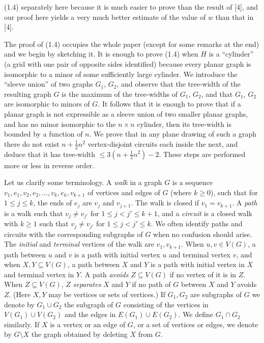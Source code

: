 \stmt
(1.4) separately here because it is much easier to prove than the result of [4], and our proof here yields a very much better estimate of the value of $w$ than that in [4].

The proof of (1.4) occupies the whole paper (except for some remarks at the end) and we begin by sketching it. It is enough to prove (1.4) when $H$ is a ``cylinder'' (a grid with one pair of opposite sides identified) because every planar graph is isomorphic to a minor of some sufficiently large cylinder. We introduce the ``sleeve union'' of two graphs $G_1$, $G_2$, and observe that the tree-width of the resulting graph $G$ is the maximum of the tree-widths of $G_1$, $G_2$, and that $G_1$, $G_2$ are isomorphic to minors of $G$. It follows that it is enough to prove that if a planar graph is not expressible as a sleeve union of two smaller planar graphs, and has no minor isomorphic to the $n \times n$ cylinder, then its tree-width is bounded by a function of $n$. We prove that in any plane drawing of such a graph there do not exist $n + \frac{1}{2} n^2$ vertex-disjoint circuits each inside the next, and deduce that it has tree-width $\le 3(n + \frac{1}{2} n^2) - 2$. These steps are performed more or less in reverse order.

Let us clarify some terminology. A \textit{walk} in a graph $G$ is a sequence $v_1, e_1, v_2, e_2, \dots, v_k, e_k, v_{k+1}$ of vertices and edges of $G$ (where $k \ge 0$), such that for $1 \le j \le k$, the ends of $e_j$ are $v_j$ and $v_{j+1}$. The walk is closed if $v_1 = v_{k+1}$. A \textit{path} is a walk such that $v_j \ne v_{j'}$ for $1 \le j < j' \le k+1$, and a \textit{circuit} is a closed walk with $k \ge 1$ such that $v_j \ne v_{j'}$ for $1 \le j < j' \le k$. We often identify paths and circuits with the corresponding subgraphs of $G$ when no confusion should arise. The \textit{initial} and \textit{terminal} vertices of the walk are $v_1, v_{k+1}$. When $u, v \in V(G)$, a path between $u$ and $v$ is a path with initial vertex $u$ and terminal vertex $v$, and when $X, Y \subseteq V(G)$, a path between $X$ and $Y$ is a path with initial vertex in $X$ and terminal vertex in $Y$. A path \textit{avoids} $Z \subseteq V(G)$ if no vertex of it is in $Z$. When $Z \subseteq V(G)$, $Z$ \textit{separates} $X$ and $Y$ if no path of $G$ between $X$ and $Y$ avoids $Z$. (Here $X, Y$ may be vertices or sets of vertices.) If $G_1, G_2$ are subgraphs of $G$ we denote by $G_1 \cup G_2$ the subgraph of $G$ consisting of the vertices in $V(G_1) \cup V(G_2)$ and the edges in $E(G_1) \cup E(G_2)$. We define $G_1 \cap G_2$ similarly. If $X$ is a vertex or an edge of $G$, or a set of vertices or edges, we denote by $G \setminus X$ the graph obtained by deleting $X$ from $G$.

